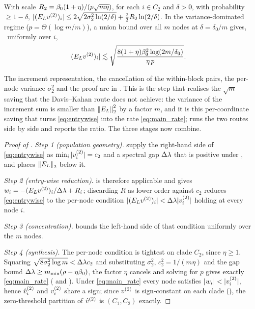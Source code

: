 \begin{lemma}\label{lem:pernode}
With scale $R_2=\beta_0(1+\eta)/(p\sqrt{m\eta})$, for each $i\in C_2$ and $\delta>0$,
with probability $\ge1-\delta$,
$|(E_{L}v^{(2)})_i|\le2\sqrt{2\sigma_2^2\ln(2/\delta)}+\tfrac23R_2\ln(2/\delta)$. In the
variance-dominated regime ($p=\Theta(\log m/m)$), a union bound over all $m$ nodes
at $\delta=\delta_0/m$ gives, \hp\ uniformly over $i$,
\begin{equation}\label{eq:concentration-bound}
   |(E_{L}v^{(2)})_i|\lesssim\sqrt{\frac{8(1+\eta)\beta_0^2\log(2m/\delta_0)}{\eta\,p}}.
\end{equation}
\end{lemma}
\noindent The increment representation, the cancellation of the within-block
pairs, the per-node variance $\sigma_2^2$ and the proof are in
. This is the step that realises the $\sqrt m$ saving that the
Davis--Kahan route does not achieve: the variance of the increment sum is smaller than
$\left\lVert E_{L} \right\rVert_{2}^2$ by a factor $m$, and it is this per-coordinate saving that turns
\eqref{eq:entrywise} into the rate \eqref{eq:main_rate};  runs
the two routes side by side and  reports the ratio. The three
stages now combine.

\begin{proof}[Proof of ]
\emph{Step 1 (population geometry).}  supply the
right-hand side of \eqref{eq:entrywise} as $\min_i|v^{(2)}_i|=c_2$ and a spectral gap
$\Delta\lambda$ that is positive under , and 
places $\left\lVert E_{L} \right\rVert_{2}$ below it.

\emph{Step 2 (entry-wise reduction).}  is therefore applicable
and gives $w_i=-(E_{L}v^{(2)})_i/\Delta\lambda+R_i$; discarding $R$ as lower order against
$c_2$ reduces \eqref{eq:entrywise} to the per-node condition
$|(E_{L}v^{(2)})_i|<\Delta\lambda|v^{(2)}_i|$ holding at every node $i$.

\emph{Step 3 (concentration).}  bounds the left-hand side of
that condition uniformly over the $m$ nodes.

\emph{Step 4 (synthesis).} The per-node condition is tightest on clade $C_2$, since
$\eta\ge1$. Squaring $\sqrt{8\sigma_2^2\log m}<\Delta\lambda c_2$ and substituting
$\sigma_2^2$, $c_2^2=1/(m\eta)$ and the gap bound
$\Delta\lambda\ge m_{\min}(\rho-\eta\beta_0)$, the factor $\eta$ cancels and solving
for $p$ gives exactly \eqref{eq:main_rate}
( and ). Under \eqref{eq:main_rate} every node satisfies
$|w_i|<|\vv_i|$, hence $\hat v^{(2)}_i$ and $v^{(2)}_i$ share a sign; since $v^{(2)}$ is
sign-constant on each clade (), the zero-threshold partition of
$\hat v^{(2)}$ is $(C_1,C_2)$ exactly.
\end{proof}

